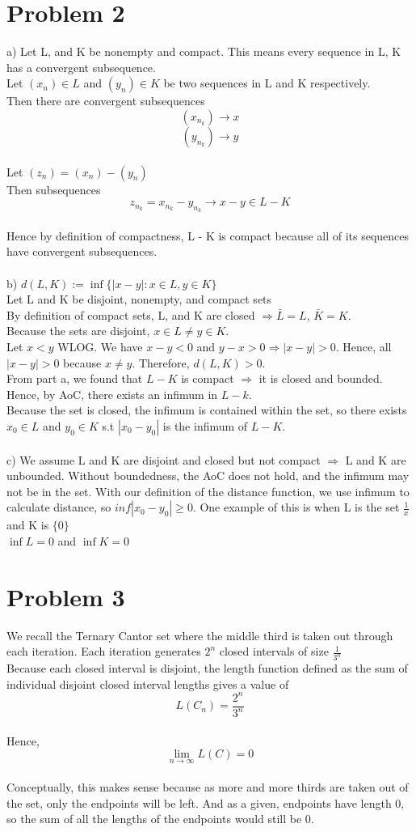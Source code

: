\documentclass{article}
\begin{document}
\section*{Problem 2}
a) Let L, and K be nonempty and compact. This means every sequence in L, K has a convergent subsequence.
\\Let $(x_n) \in L$ and $(y_n) \in K$ be two sequences in L and K respectively.
\\Then there are convergent subsequences $$(x_{n_k}) \to x$$ $$(y_{n_k}) \to y$$
\\Let $(z_n) = (x_n) - (y_n)$
\\Then subsequences $$z_{n_k} = x_{n_k} - y_{n_k} \to x - y \in L - K$$
\\Hence by definition of compactness, L - K is compact because all of its sequences have convergent subsequences.
\\
\\b) $d(L,K) := \inf\{|x-y|:x \in L, y \in K\}$
\\Let L and K be disjoint, nonempty, and compact sets
\\By definition of compact sets, L, and K are closed $\Rightarrow \bar{L} = L$, $\bar{K} = K$.
\\Because the sets are disjoint, $x \in L \neq y \in K$.
\\Let $x < y$ WLOG. We have $x-y < 0$ and $y - x > 0 \Rightarrow |x-y| > 0$. Hence, all $|x-y| > 0$ because $x \neq y$. Therefore, $d(L, K) > 0$.
\\From part a, we found that $L - K$ is compact $\Rightarrow$ it is closed and bounded. Hence, by AoC, there exists an infimum in $L - k$.
\\Because the set is closed, the infimum is contained within the set, so there exists $x_0 \in L$ and $y_0 \in K$ s.t $|x_0 - y_0|$ is the infimum of $L - K$.
\\
\\c) We assume L and K are disjoint and closed but not compact $\Rightarrow$ L and K are unbounded. Without boundedness, the AoC does not hold, and the infimum may not be in the set. With our definition of the distance function, we use infimum to calculate distance, so $inf|x_0 - y_0| \geq 0$. One example of this is when L is the set $\frac{1}{x}$ and K is $\{0\}$
\\$\inf L = 0$ and $\inf K = 0$

\section*{Problem 3}
We recall the Ternary Cantor set where the middle third is taken out through each iteration. Each iteration generates $2^n$ closed intervals of size $\frac{1}{3^n}$
\\Because each closed interval is disjoint, the length function defined as the sum of individual disjoint closed interval lengths gives a value of $$L(C_n) = \frac{2^n}{3^n}$$
\\Hence, $$\lim_{n \to \infty} L(C) = 0$$
\\Conceptually, this makes sense because as more and more thirds are taken out of the set, only the endpoints will be left. And as a given, endpoints have length 0, so the sum of all the lengths of the endpoints would still be 0.
\end{document}
